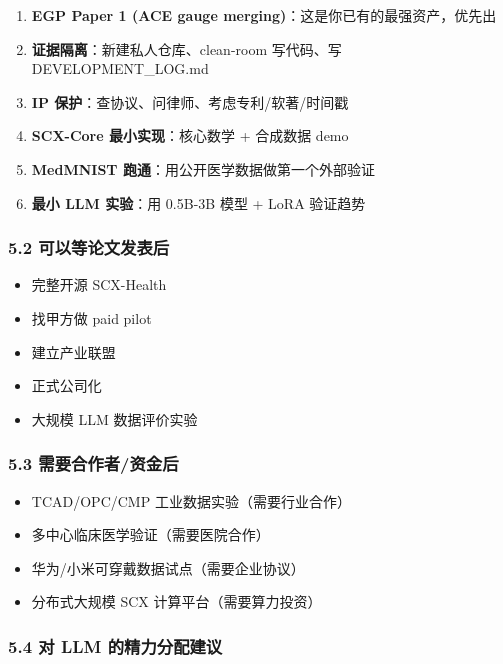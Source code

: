 \documentclass[
  12pt,
]{ctexart}
\providecommand{\tightlist}{%
  \setlength{\itemsep}{0pt}\setlength{\parskip}{0pt}}
\begin{document}
\begin{enumerate}
\def\labelenumi{\arabic{enumi}.}
\tightlist
\item
  \textbf{EGP Paper 1 (ACE gauge merging)}：这是你已有的最强资产，优先出
\item
  \textbf{证据隔离}：新建私人仓库、clean-room 写代码、写
  DEVELOPMENT\_LOG.md
\item
  \textbf{IP 保护}：查协议、问律师、考虑专利/软著/时间戳
\item
  \textbf{SCX-Core 最小实现}：核心数学 + 合成数据 demo
\item
  \textbf{MedMNIST 跑通}：用公开医学数据做第一个外部验证
\item
  \textbf{最小 LLM 实验}：用 0.5B-3B 模型 + LoRA 验证趋势
\end{enumerate}

\subsubsection{5.2
可以等论文发表后}\label{ux53efux4ee5ux7b49ux8bbaux6587ux53d1ux8868ux540e}

\begin{itemize}
\tightlist
\item
  完整开源 SCX-Health
\item
  找甲方做 paid pilot
\item
  建立产业联盟
\item
  正式公司化
\item
  大规模 LLM 数据评价实验
\end{itemize}

\subsubsection{5.3
需要合作者/资金后}\label{ux9700ux8981ux5408ux4f5cux8005ux8d44ux91d1ux540e}

\begin{itemize}
\tightlist
\item
  TCAD/OPC/CMP 工业数据实验（需要行业合作）
\item
  多中心临床医学验证（需要医院合作）
\item
  华为/小米可穿戴数据试点（需要企业协议）
\item
  分布式大规模 SCX 计算平台（需要算力投资）
\end{itemize}

\subsubsection{5.4 对 LLM
的精力分配建议}\label{ux5bf9-llm-ux7684ux7cbeux529bux5206ux914dux5efaux8bae}
\end{document}
